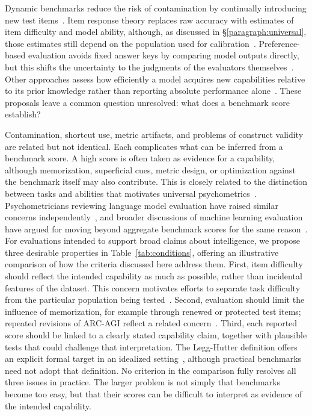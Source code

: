 \documentclass[acmsmall,screen,review,anonymous]{acmart}
\begin{document}
Dynamic benchmarks reduce the risk of contamination by continually introducing new test items~\citep{white2025livebench}.
%
Item response theory replaces raw accuracy with estimates of item difficulty and model ability, although, as discussed in \S\ref{paragraph:universal}, those estimates still depend on the population used for calibration~\citep{MARTINEZPLUMED201918}.
%
Preference-based evaluation avoids fixed answer keys by comparing model outputs directly, but this shifts the uncertainty to the judgments of the evaluators themselves~\citep{NEURIPS2023_91f18a12}.
%
Other approaches assess how efficiently a model acquires new capabilities relative to its prior knowledge rather than reporting absolute performance alone~\citep{chollet2019measureintelligence}.
%
These proposals leave a common question unresolved: what does a benchmark score establish?

Contamination, shortcut use, metric artifacts, and problems of construct validity are related but not identical.
%
Each complicates what can be inferred from a benchmark score.
%
A high score is often taken as evidence for a capability, although memorization, superficial cues, metric design, or optimization against the benchmark itself may also contribute.
%
This is closely related to the distinction between tasks and abilities that motivates universal psychometrics~\citep{hernandezorallo2017}.
%
Psychometricians reviewing language model evaluation have raised similar concerns independently~\citep{ye2026largelanguagemodelpsychometrics}, and broader discussions of machine learning evaluation have argued for moving beyond aggregate benchmark scores for the same reason~\citep{burnell2023rethink}.
%
For evaluations intended to support broad claims about intelligence, we propose three desirable properties in Table~\ref{tab:conditions}, offering an illustrative comparison of how the criteria discussed here address them.
%
First, item difficulty should reflect the intended capability as much as possible, rather than incidental features of the dataset.
%
This concern motivates efforts to separate task difficulty from the particular population being tested~\citep{HERNANDEZORALLO20101508, MARTINEZPLUMED201918}.
%
Second, evaluation should limit the influence of memorization, for example through renewed or protected test items; repeated revisions of ARC-AGI reflect a related concern~\citep{chollet2026arcagi2newchallengefrontier}.
%
Third, each reported score should be linked to a clearly stated capability claim, together with plausible tests that could challenge that interpretation.
%
The Legg-Hutter definition offers an explicit formal target in an idealized setting~\citep{legghutter2007}, although practical benchmarks need not adopt that definition.
%
No criterion in the comparison fully resolves all three issues in practice.
%
The larger problem is not simply that benchmarks become too easy, but that their scores can be difficult to interpret as evidence of the intended capability.
\end{document}
